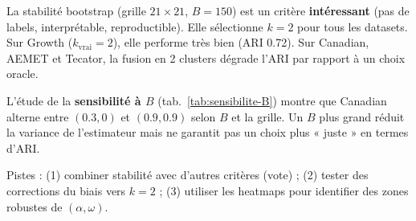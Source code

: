 \documentclass[11pt, a4paper]{article}
\begin{document}
La stabilité bootstrap (grille $21 \times 21$, $B = 150$) est un critère
\textbf{intéressant} (pas de labels, interprétable, reproductible). Elle
sélectionne $k = 2$ pour tous les datasets. Sur Growth ($k_{\mathrm{vrai}} =
2$), elle performe très bien (ARI 0.72). Sur Canadian, AEMET et Tecator, la
fusion en 2 clusters dégrade l'ARI par rapport à un choix oracle.

L'étude de la \textbf{sensibilité à $B$} (tab.~\ref{tab:sensibilite-B}) montre
que Canadian alterne entre $(0.3, 0)$ et $(0.9, 0.9)$ selon $B$ et la grille.
Un $B$ plus grand réduit la variance de l'estimateur mais ne garantit pas
un choix plus « juste » en termes d'ARI.

Pistes : (1) combiner stabilité avec d'autres critères (vote) ; (2) tester
des corrections du biais vers $k = 2$ ; (3) utiliser les heatmaps pour
identifier des zones robustes de $(\alpha, \omega)$.
\end{document}
